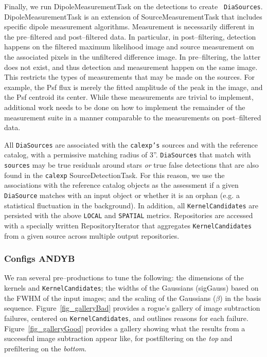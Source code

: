 \documentclass[prd, nofootinbib, floatfix, 11pt,tightenlines,times]{article}
\begin{document}
Finally, we run DipoleMeasurementTask on the detections to create {\tt
  DiaSources}.  DipoleMeasurementTask is an extension of
SourceMeasurementTask that includes specific dipole measurement
algorithms.  Measurement is necessarily different in the pre--filtered
and post--filtered data.  In particular, in post--filtering, detection
happens on the filtered maximum likelihood image and source
measurement on the associated pixels in the unfiltered difference
image.  In pre--filtering, the latter does not exist, and thus
detection and measurement happen on the same image.  This restricts
the types of measurements that may be made on the sources.  For
example, the Psf flux is merely the fitted amplitude of the peak in
the image, and the Psf centroid its center.  While these measurements
are trivial to implement, additional work needs to be done on how to
implement the remainder of the measurement suite in a manner
comparable to the measurements on post--filtered data.

All {\tt DiaSources} are associated with the {\tt calexp's} sources
and with the reference catalog, with a permissive matching radius of
3''.  {\tt DiaSources} that match with {\tt sources} may be true
residuals around stars {\it or} true false detections that are also
found in the {\tt calexp} SourceDetectionTask.  For this reason, we
use the associations with the reference catalog objects as the
assessment if a given {\tt DiaSource} matches with an input object or
whether it is an orphan (e.g. a statistical fluctuation in the
background).  In addition, all {\tt KernelCandidates} are persisted
with the above {\tt LOCAL} and {\tt SPATIAL} metrics.  Repositories
are accessed with a specially written RepositoryIterator that
aggregates {\tt KernelCandidates} from a given source across multiple
output repositories.

\subsubsection{Configs {\bf ANDYB}}

We ran several pre--productions to tune the following: the dimensions
of the kernels and {\tt KernelCandidates}; the widths of the Gaussians
(sigGauss) based on the FWHM of the input images; and the scaling of
the Gaussians ($\beta$) in the basis sequence.
Figure~\ref{fig_galleryBad} provides a rogue's gallery of image
subtraction failures, centered on {\tt KernelCandidates}, and outlines
reasons for each failure.  Figure~\ref{fig_galleryGood} provides a
gallery showing what the results from a successful image subtraction
appear like, for postfiltering on the {\it top} and prefiltering on
the {\it bottom}.
\end{document}
